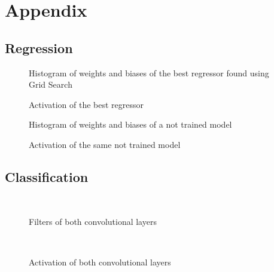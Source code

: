 \documentclass[11pt,a4paper,twocolumn]{IEEEtran}
\begin{document}
	\onecolumn
	\section{\textbf{Appendix}}
		\subsection{Regression}
			\begin{figure}[h]
				\centering
				
				\caption{Histogram of weights and biases of the best regressor found using Grid Search}
			\end{figure}
			\begin{figure}[h]
				\centering
				
				\caption{Activation of the best regressor}
			\end{figure}
			\newpage
			\begin{figure}[h]
				\centering
				
				\caption{Histogram of weights and biases of a not trained model}
			\end{figure}
			\begin{figure}[h]
				\centering
				
				\caption{Activation of the same not trained model}
			\end{figure}
		\newpage\subsection{Classification}
			\begin{figure}[h]
				\centering
				\\
				
				\caption{Filters of both convolutional layers}
			\end{figure}
			\begin{figure}[h]
				\centering
				\\
				
				\caption{Activation of both convolutional layers}
			\end{figure}
\end{document}
